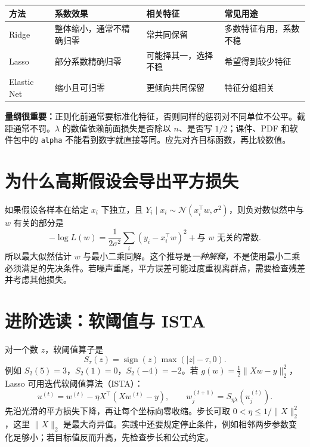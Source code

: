 \documentclass[UTF8,11pt,oneside]{ctexbook}
\begin{document}
\begin{center}\begin{tabular}{p{2.6cm}p{3.7cm}p{3.5cm}p{3.6cm}}\toprule
方法&系数效果&相关特征&常见用途\\\midrule
Ridge&整体缩小，通常不精确归零&常共同保留&多数特征有用，系数不稳\\
Lasso&部分系数精确归零&可能择其一，选择不稳&希望得到较少特征\\
Elastic Net&缩小且可归零&更倾向共同保留&特征分组相关\\\bottomrule\end{tabular}\end{center}

\textbf{量纲很重要：}正则化前通常要标准化特征，否则同样的惩罚对不同单位不公平。截距通常不罚。$\lambda$ 的数值依赖前面损失是否除以 $n$、是否写 $1/2$；课件、PDF 和软件包中的 \texttt{alpha} 不能看到数字就直接等同。应先对齐目标函数，再比较数值。

\section{为什么高斯假设会导出平方损失}
如果假设各样本在给定 $x_i$ 下独立，且 $Y_i\mid x_i\sim\mathcal N(x_i^\top w,\sigma^2)$，则负对数似然中与 $w$ 有关的部分是
\[
-\log L(w)=\frac{1}{2\sigma^2}\sum_i(y_i-x_i^\top w)^2+\text{与 }w\text{ 无关的常数}.
\]
所以最大似然估计 $w$ 与最小二乘同解。这个推导是\emph{一种解释}，不是使用最小二乘必须满足的先决条件。若噪声重尾，平方误差可能过度重视离群点，需要检查残差并考虑其他损失。

\section{进阶选读：软阈值与 ISTA}
对一个数 $z$，软阈值算子是
\[
S_\tau(z)=\operatorname{sign}(z)\max(|z|-\tau,0).
\]
例如 $S_2(5)=3$，$S_2(1)=0$，$S_2(-4)=-2$。若 $g(w)=\frac12\|Xw-y\|_2^2$，Lasso 可用迭代软阈值算法（ISTA）：
\[
u^{(t)}=w^{(t)}-\eta X^\top(Xw^{(t)}-y),\qquad
w_j^{(t+1)}=S_{\eta\lambda}(u_j^{(t)}).
\]
先沿光滑的平方损失下降，再让每个坐标向零收缩。步长可取 $0<\eta\le 1/\|X\|_2^2$，这里 $\|X\|_2$ 是最大奇异值。实践中还要规定停止条件，例如相邻两步参数变化足够小；若目标值反而升高，先检查步长和公式约定。
\end{document}
